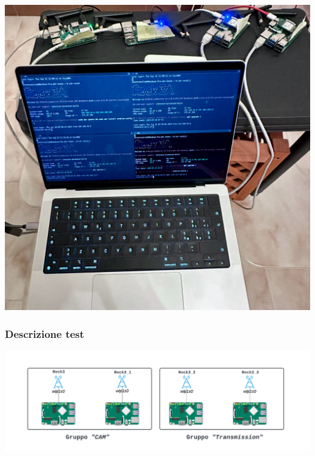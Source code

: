 \documentclass{beamer}
\begin{document}
\begin{frame}
\begin{minipage}{0.35\textwidth}
        \vspace{0.5cm}
        \includegraphics[width=\textwidth]{topology_photo.jpg}
    \end{minipage}
\end{frame}

\begin{frame}
    \frametitle{Descrizione test}
    \includegraphics[width=\textwidth]{Rock scheme.png}
\end{frame}
\end{document}
